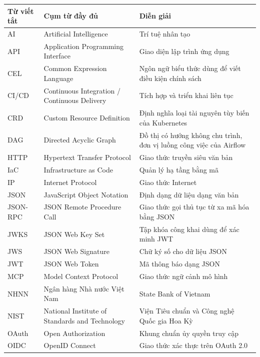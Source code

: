 {\singlespacing\renewcommand{\arraystretch}{1.5}
\begin{longtable}{|>{\centering\arraybackslash}p{2.2cm}|>{\centering\arraybackslash}p{6.1cm}|>{\centering\arraybackslash}p{6.1cm}|}\hline
\textbf{Từ viết tắt} & \textbf{Cụm từ đầy đủ} & \textbf{Diễn giải} \\ \hline
\endhead
AI & Artificial Intelligence & Trí tuệ nhân tạo \\ \hline
API & Application Programming Interface & Giao diện lập trình ứng dụng \\ \hline
CEL & Common Expression Language & Ngôn ngữ biểu thức dùng để viết điều kiện chính sách \\ \hline
CI/CD & Continuous Integration / Continuous Delivery & Tích hợp và triển khai liên tục \\ \hline
CRD & Custom Resource Definition & Định nghĩa loại tài nguyên tùy biến của Kubernetes \\ \hline
DAG & Directed Acyclic Graph & Đồ thị có hướng không chu trình, đơn vị luồng công việc của Airflow \\ \hline
HTTP & Hypertext Transfer Protocol & Giao thức truyền siêu văn bản \\ \hline
IaC & Infrastructure as Code & Quản lý hạ tầng bằng mã \\ \hline
IP & Internet Protocol & Giao thức Internet \\ \hline
JSON & JavaScript Object Notation & Định dạng dữ liệu dạng văn bản \\ \hline
JSON-RPC & JSON Remote Procedure Call & Giao thức gọi thủ tục từ xa mã hóa bằng JSON \\ \hline
JWKS & JSON Web Key Set & Tập khóa công khai dùng để xác minh JWT \\ \hline
JWS & JSON Web Signature & Chữ ký số cho dữ liệu JSON \\ \hline
JWT & JSON Web Token & Mã thông báo dạng JSON \\ \hline
MCP & Model Context Protocol & Giao thức ngữ cảnh mô hình \\ \hline
NHNN & Ngân hàng Nhà nước Việt Nam & State Bank of Vietnam \\ \hline
NIST & National Institute of Standards and Technology & Viện Tiêu chuẩn và Công nghệ Quốc gia Hoa Kỳ \\ \hline
OAuth & Open Authorization & Khung chuẩn ủy quyền truy cập \\ \hline
OIDC & OpenID Connect & Giao thức xác thực trên OAuth 2.0 \\ \hline

\end{longtable}}
